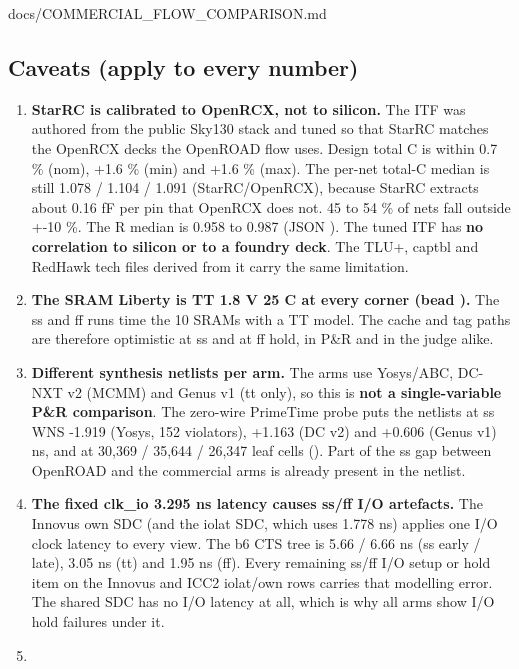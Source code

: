 \begin{relocated}{docs/COMMERCIAL_FLOW_COMPARISON.md}
\subsection{Caveats (apply to every number)}\label{tm:pd:commercial-flow-comparison:2-caveats-apply-to-every-number}

\begin{enumerate}
\def\labelenumi{\arabic{enumi}.}
\tightlist
\item
  \textbf{StarRC is calibrated to OpenRCX, not to silicon.} The ITF was
  authored from the public Sky130 stack and tuned so that StarRC matches
  the OpenRCX decks the OpenROAD flow uses. Design total C is within 0.7
  \% (nom), +1.6 \% (min) and +1.6 \% (max). The per-net total-C median
  is still 1.078 / 1.104 / 1.091 (StarRC/\allowbreak{}OpenRCX), because
  StarRC extracts about 0.16 fF per pin that OpenRCX does not. 45 to 54
  \% of nets fall outside +-10 \%. The R median is 0.958 to 0.987 (JSON
  ). The tuned ITF has \textbf{no
  correlation to silicon or to a foundry deck}. The TLU+, captbl and
  RedHawk tech files derived from it carry the same limitation.
\item
  \textbf{The SRAM Liberty is TT 1.8 V 25 C at every corner (bead
  ).} The ss and ff runs time the 10 SRAMs with a TT model.
  The cache  and tag paths are therefore optimistic at ss
  and at ff hold, in P\&R and in the judge alike.
\item
  \textbf{Different synthesis netlists per arm.} The arms use
  Yosys/\allowbreak{}ABC, DC-NXT v2 (MCMM) and Genus v1 (tt only), so
  this is \textbf{not a single-variable P\&R comparison}. The zero-wire
  PrimeTime probe puts the netlists at ss WNS -1.919 (Yosys, 152
  violators), +1.163 (DC v2) and +0.606 (Genus v1) ns, and at 30,369 /
  35,644 / 26,347 leaf cells (). Part
  of the ss gap between OpenROAD and the commercial arms is already
  present in the netlist.
\item
  \textbf{The fixed clk\_io 3.295 ns latency causes ss/ff I/O
  artefacts.} The Innovus own SDC (and the iolat SDC, which uses 1.778
  ns) applies one I/O clock latency to every view. The b6 CTS tree is
  5.66 / 6.66 ns (ss early / late), 3.05 ns (tt) and 1.95 ns (ff). Every
  remaining ss/ff I/O setup or hold item on the Innovus and ICC2
  iolat/own rows carries that modelling error. The shared SDC has no I/O
  latency at all, which is why all arms show I/O hold failures under it.
\item

\end{enumerate}
\end{relocated}
